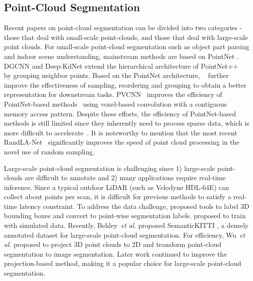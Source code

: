 \documentclass[runningheads]{llncs}
\begin{document}
\subsection{Point-Cloud Segmentation}
Recent papers on point-cloud segmentation can be divided into two categories - those that deal with small-scale point-clouds, and those that deal with large-scale point clouds. For small-scale point-cloud segmentation such as object part parsing and indoor scene understanding, mainstream methods are based on PointNet \cite{qi2017pointnet,qi2017pointnet++}. DGCNN \cite{wang2019dynamic} and Deep-KdNet \cite{klokov2017escape} extend the hierarchical architecture of PointNet++~\cite{qi2017pointnet++} by grouping neighbor points. Based on the PointNet architecture, ~\cite{dovrat2019learning,li2018so,li2018pointcnn} further improve the effectiveness of sampling, reordering and grouping to obtain a better representation for downstream tasks. PVCNN~\cite{liu2019point} improves the efficiency of PointNet-based methods~\cite{liu2019point,wang2019dynamic} using voxel-based convolution with a contiguous memory access pattern. Despite these efforts, the efficiency of PointNet-based methods is still limited since they inherently need to process sparse data, which is more difficult to accelerate~\cite{liu2019point}. It is noteworthy to mention that the most recent RandLA-Net~\cite{hu2019randla} significantly improves the speed of point cloud processing in the novel use of random sampling. 

Large-scale point-cloud segmentation is challenging since 1) large-scale point-clouds are difficult to annotate and 2) many applications require real-time inference. Since a typical outdoor LiDAR (such as Velodyne HDL-64E) can collect about  points per scan, it is difficult for previous methods \cite{landrieu2018large,riegler2017octnet,tchapmi2017segcloud,liu20173dcnn,rethage2018fully,mo2019partnet,meng2019vv} to satisfy a real-time latency constraint. To address the data challenge, \cite{wu2017squeezeseg,wang2019latte} proposed tools to label 3D bounding boxes and convert to point-wise segmentation labels. \cite{wu2017squeezeseg,wu2018squeezesegv2,yue2018lidar} proposed to train with simulated data. Recently, Behley~\textit{et al.} proposed SemanticKITTI \cite{behley2019iccv}, a densely annotated dataset for large-scale point-cloud segmentation. For efficiency, Wu~\textit{et al.} \cite{wu2017squeezeseg} proposed to project 3D point clouds to 2D and transform point-cloud segmentation to image segmentation. Later work \cite{wu2018squeezesegv2,behley2019iccv,milioto2019rangenet++} continued to improve the projection-based method, making it a popular choice for large-scale point-cloud segmentation. 
\end{document}
